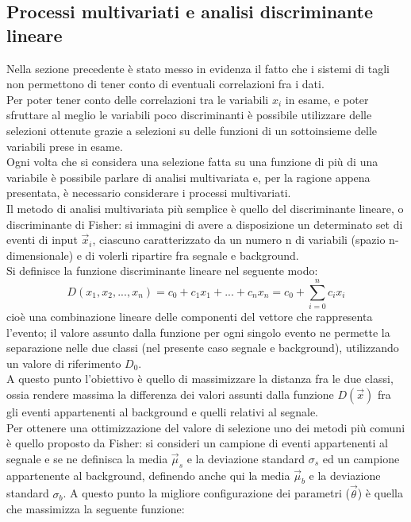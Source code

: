 \newpage
\subsection{Processi multivariati e analisi discriminante lineare}
\label{metodi lineari e discriminante di Fisher}

Nella sezione precedente è stato messo in evidenza il fatto che i sistemi di tagli non permettono di tener conto di eventuali correlazioni fra i dati.\\
Per poter tener conto delle correlazioni tra le variabili $x_i$ in esame, e poter sfruttare al meglio le variabili poco discriminanti è possibile utilizzare delle selezioni ottenute grazie a selezioni su delle funzioni di un sottoinsieme delle variabili prese in esame. \\
Ogni volta che si considera una selezione fatta su una funzione di più di una variabile è possibile parlare di analisi multivariata e, per la ragione appena presentata, è necessario considerare i processi multivariati.\\
Il metodo di analisi multivariata più semplice è quello del discriminante lineare, o discriminante di Fisher: si immagini di avere a disposizione un determinato set di eventi di input $\vec{x}_i$, ciascuno caratterizzato da un numero n di variabili (spazio n-dimensionale) e di volerli ripartire fra segnale e background.\\
Si definisce la funzione discriminante lineare nel seguente modo:
\begin{equation}
D(x_1 , x_2 , ... , x_n) = c_0 + c_1x_1 + ... +c_nx_n = c_0 + \sum_{i=0}^{n} c_ix_i 
\end{equation}
cioè una combinazione lineare delle componenti del vettore che rappresenta l'evento; il valore assunto dalla funzione per ogni singolo evento ne permette la separazione nelle due classi (nel presente caso segnale e background), utilizzando un valore di riferimento $D_0$. \\
A questo punto l'obiettivo è quello di massimizzare la distanza fra le due classi, ossia rendere massima la differenza dei valori assunti dalla funzione $D(\vec{x})$ fra gli eventi appartenenti al background e quelli relativi al segnale. \\
Per ottenere una ottimizzazione del valore di selezione uno dei metodi più comuni è quello proposto da Fisher: si consideri un campione di eventi appartenenti al segnale e se ne definisca la media $\vec\mu_s$ e la deviazione standard $\sigma_s$ ed un campione appartenente al background, definendo anche qui la media $\vec\mu_b$ e la deviazione standard $\sigma_b$. A questo punto la migliore configurazione dei parametri ($\vec{\theta}$) è quella che massimizza la seguente funzione: 
